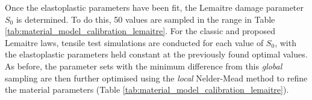 \documentclass[sn-mathphys,Numbered]{sn-jnl}%
\begin{document}
Once the elastoplastic parameters have been fit, the Lemaitre damage parameter $S_0$ is determined. %
To do this, 50 values are sampled in the range in Table \ref{tab:material_model_calibration_lemaitre}.
For the classic and proposed Lemaitre laws, tensile test simulations are conducted for each value of $S_0$, with the elastoplastic parameters held constant at the previously found optimal values.
As before, the parameter sets with the minimum difference from this \emph{global} sampling are then further optimised using the \emph{local} Nelder-Mead method \cite{luersen_globalized_2004} to refine the material parameters (Table \ref{tab:material_model_calibration_lemaitre}).
\end{document}

